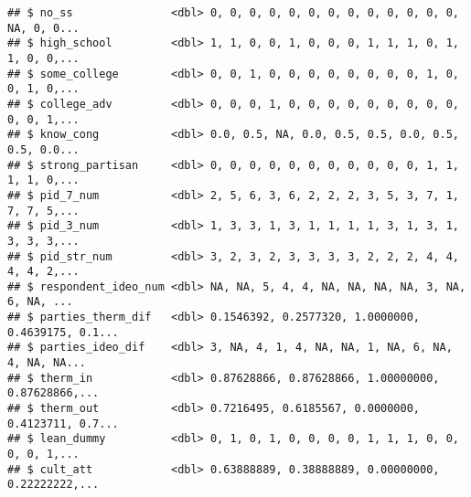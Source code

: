 \documentclass[
]{article}
\newenvironment{Shaded}{\begin{snugshade}}{\end{snugshade}}
\newcommand{\DataTypeTok}[1]{\textcolor[rgb]{0.13,0.29,0.53}{#1}}
\newcommand{\KeywordTok}[1]{\textcolor[rgb]{0.13,0.29,0.53}{\textbf{#1}}}
\newcommand{\NormalTok}[1]{#1}
\newcommand{\OperatorTok}[1]{\textcolor[rgb]{0.81,0.36,0.00}{\textbf{#1}}}
\newcommand{\OtherTok}[1]{\textcolor[rgb]{0.56,0.35,0.01}{#1}}
\newcommand{\StringTok}[1]{\textcolor[rgb]{0.31,0.60,0.02}{#1}}
\begin{document}
\begin{verbatim}
## $ no_ss               <dbl> 0, 0, 0, 0, 0, 0, 0, 0, 0, 0, 0, 0, 0, NA, 0, 0...
## $ high_school         <dbl> 1, 1, 0, 0, 1, 0, 0, 0, 1, 1, 1, 0, 1, 1, 0, 0,...
## $ some_college        <dbl> 0, 0, 1, 0, 0, 0, 0, 0, 0, 0, 0, 1, 0, 0, 1, 0,...
## $ college_adv         <dbl> 0, 0, 0, 1, 0, 0, 0, 0, 0, 0, 0, 0, 0, 0, 0, 1,...
## $ know_cong           <dbl> 0.0, 0.5, NA, 0.0, 0.5, 0.5, 0.0, 0.5, 0.5, 0.0...
## $ strong_partisan     <dbl> 0, 0, 0, 0, 0, 0, 0, 0, 0, 0, 0, 1, 1, 1, 1, 0,...
## $ pid_7_num           <dbl> 2, 5, 6, 3, 6, 2, 2, 2, 3, 5, 3, 7, 1, 7, 7, 5,...
## $ pid_3_num           <dbl> 1, 3, 3, 1, 3, 1, 1, 1, 1, 3, 1, 3, 1, 3, 3, 3,...
## $ pid_str_num         <dbl> 3, 2, 3, 2, 3, 3, 3, 3, 2, 2, 2, 4, 4, 4, 4, 2,...
## $ respondent_ideo_num <dbl> NA, NA, 5, 4, 4, NA, NA, NA, NA, 3, NA, 6, NA, ...
## $ parties_therm_dif   <dbl> 0.1546392, 0.2577320, 1.0000000, 0.4639175, 0.1...
## $ parties_ideo_dif    <dbl> 3, NA, 4, 1, 4, NA, NA, 1, NA, 6, NA, 4, NA, NA...
## $ therm_in            <dbl> 0.87628866, 0.87628866, 1.00000000, 0.87628866,...
## $ therm_out           <dbl> 0.7216495, 0.6185567, 0.0000000, 0.4123711, 0.7...
## $ lean_dummy          <dbl> 0, 1, 0, 1, 0, 0, 0, 0, 1, 1, 1, 0, 0, 0, 0, 1,...
## $ cult_att            <dbl> 0.63888889, 0.38888889, 0.00000000, 0.22222222,...
\end{verbatim}

\begin{Shaded}
\end{Shaded}
\end{document}
